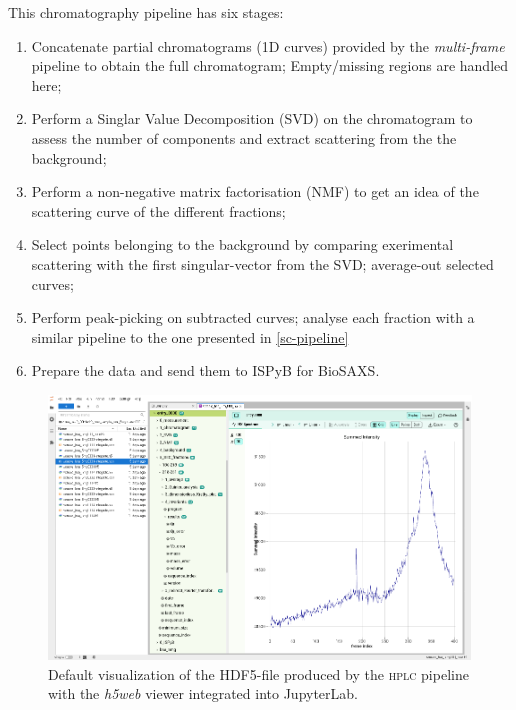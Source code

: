 \documentclass[preprint]{iucr}              %
\begin{document}
This chromatography pipeline has six stages:
\begin{enumerate}
    \item Concatenate partial chromatograms (1D curves) provided by the \textit{multi-frame} pipeline to obtain the full chromatogram; Empty/missing regions are handled here;
    \item Perform a Singlar Value Decomposition (SVD) on the chromatogram to assess the number of components and extract scattering from the the background; 
    \item Perform a non-negative matrix factorisation (NMF) to get an idea of the scattering curve of the different fractions; 
    \item Select points belonging to the background by comparing exerimental scattering with the first singular-vector from the SVD; average-out selected curves; %
    \item Perform peak-picking on subtracted curves; analyse each fraction with a similar pipeline to the one presented in \ref{sc-pipeline} %
    \item Prepare the data and send them to ISPyB for BioSAXS.
\end{enumerate}

\begin{figure}
\label{hplc}
\begin{center}
\includegraphics[width=12cm]{HPLC-h5web.eps}
\caption{Default visualization of the HDF5-file produced by the \textsc{hplc} pipeline with the \textit{h5web} viewer integrated into JupyterLab.}
\end{center}
\end{figure}
\end{document}
